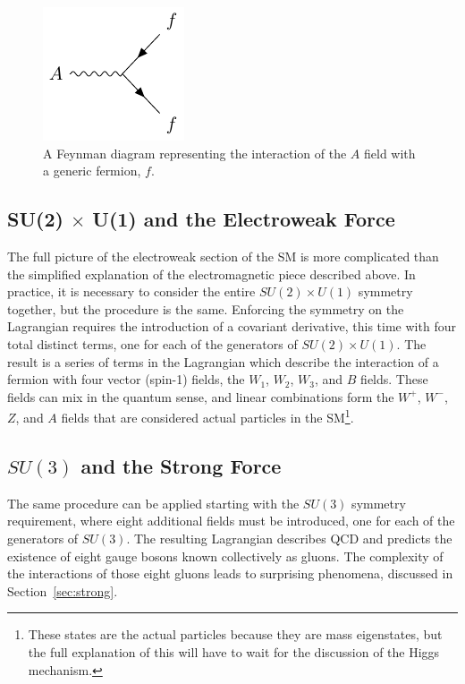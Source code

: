 \begin{figure}
\centering
\includegraphics[width=\halffig]{figures/feyn_aff.pdf}
\caption{A Feynman diagram representing the interaction of the $A$ field with a generic fermion, $f$.} 
\label{fig:feyn_aff}
\end{figure}


\subsection{SU(2) $\times$ U(1) and the Electroweak Force}

The full picture of the electroweak section of the \ac{SM} is more complicated than the simplified explanation of the electromagnetic piece described above. 
In practice, it is necessary to consider the entire $SU(2)\times U(1)$ symmetry together, but the procedure is the same.
Enforcing the symmetry on the Lagrangian requires the introduction of a covariant derivative, this time with four total distinct terms, one for each of the generators of $SU(2)\times U(1)$.
The result is a series of terms in the Lagrangian which describe the interaction of a fermion with four vector (spin-1) fields, the $W_1$, $W_2$, $W_3$, and $B$ fields.
These fields can mix in the quantum sense, and linear combinations form the $W^+$, $W^-$, $Z$, and $A$ fields that are considered actual particles in the \ac{SM}\footnote{These states are the actual particles because they are mass eigenstates, but the full explanation of this will have to wait for the discussion of the Higgs mechanism.}.

\subsection{$SU(3)$ and the Strong Force}

The same procedure can be applied starting with the $SU(3)$ symmetry requirement, where eight additional fields must be introduced, one for each of the generators of $SU(3)$.
The resulting Lagrangian describes \ac{QCD} and predicts the existence of eight gauge bosons known collectively as gluons. 
The complexity of the interactions of those eight gluons leads to surprising phenomena, discussed in Section~\ref{sec:strong}.

